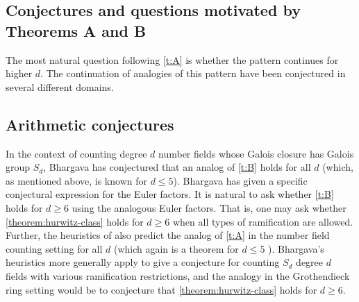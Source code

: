\documentclass[12 pt]{amsart}
\theoremstyle{plain}
\theoremstyle{definition}
\theoremstyle{remark}
\numberwithin{equation}{section}
\begin{document}
\subsection{Conjectures and questions motivated by Theorems A and B} \label{s:conjectures}

The most natural question following \autoref{t:A} is whether the pattern continues for higher $d$.  The continuation of analogies of this pattern have been conjectured in several different domains.  



\subsection{Arithmetic conjectures}
In the context of counting degree $d$ number fields whose Galois closure has
Galois group $S_d$,
Bhargava \cite[Conj.\ 1.2]{Bhargava2010} has conjectured that an analog of \autoref{t:B} holds for all $d$ (which, as mentioned above, is known for $d\leq 5$). Bhargava has given a specific conjectural expression for the Euler factors.
It is natural to ask whether \autoref{t:B} holds for $d\geq 6$ using the analogous
Euler factors. 
That is, one may ask whether \autoref{theorem:hurwitz-class} holds for $d\geq 6$ when all types of ramification are allowed.  Further, the heuristics of \cite{Bhargava2010} also predict the
analog of \autoref{t:A} in the number field counting setting for all $d$ (which again is a theorem for $d\leq 5$ 
\cite[Thm.\ 1.1]{bhargava:the-geometric-sieve}).
Bhargava's heuristics more generally apply to give a conjecture for counting
$S_d$ degree $d$ fields with various ramification restrictions, and the analogy in the Grothendieck ring setting would be to conjecture that \autoref{theorem:hurwitz-class} holds for $d\geq 6$.
\end{document}

